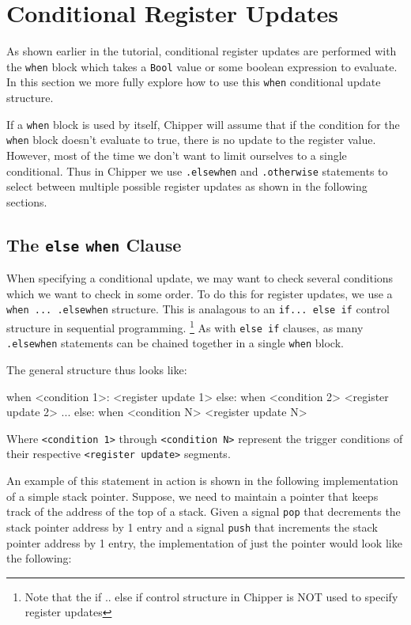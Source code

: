 \section{Conditional Register Updates}

As shown earlier in the tutorial, conditional register updates are performed with the \verb+when+ block which takes a \verb+Bool+ value or some boolean expression to evaluate.
In this section we more fully explore how to use this \verb+when+ conditional update structure.

If a \verb+when+ block is used by itself, Chipper will assume that if the condition for the \verb+when+ block doesn't evaluate to true, there is no update to the register value. However, most of the time we don't want to limit ourselves to a single conditional. Thus in Chipper we use \verb+.elsewhen+ and \verb+.otherwise+ statements to select between multiple possible register updates as shown in the following sections.

\subsection{The {\tt else} {\tt when} Clause}

When specifying a conditional update, we may want to check several conditions which we want to check in some order. 
To do this for register updates, we use a \verb+when ... .elsewhen+ structure. This is analagous to an \verb+if... else if+ control structure in sequential programming. \footnote{Note that the if .. else if control structure in Chipper is NOT used to specify register updates} 
As with \verb+else if+ clauses, as many \verb+.elsewhen+ statements can be chained together in a single \verb+when+ block. 

The general structure thus looks like:


\begin{stanza}
when <condition 1>: <register update 1>
else: when <condition 2> <register update 2>
...
else: when <condition N> <register update N>
\end{stanza}

Where \verb+<condition 1>+ through \verb+<condition N>+ represent the trigger conditions of their respective \verb+<register update>+ segments.

An example of this statement in action is shown in the following implementation of a simple stack pointer. Suppose, we need to maintain a pointer that keeps track of the address of the top of a stack. Given a signal \verb+pop+ that decrements the stack pointer address by 1 entry and a signal \verb+push+ that increments the stack pointer address by 1 entry, the implementation of just the pointer would look like the following:

